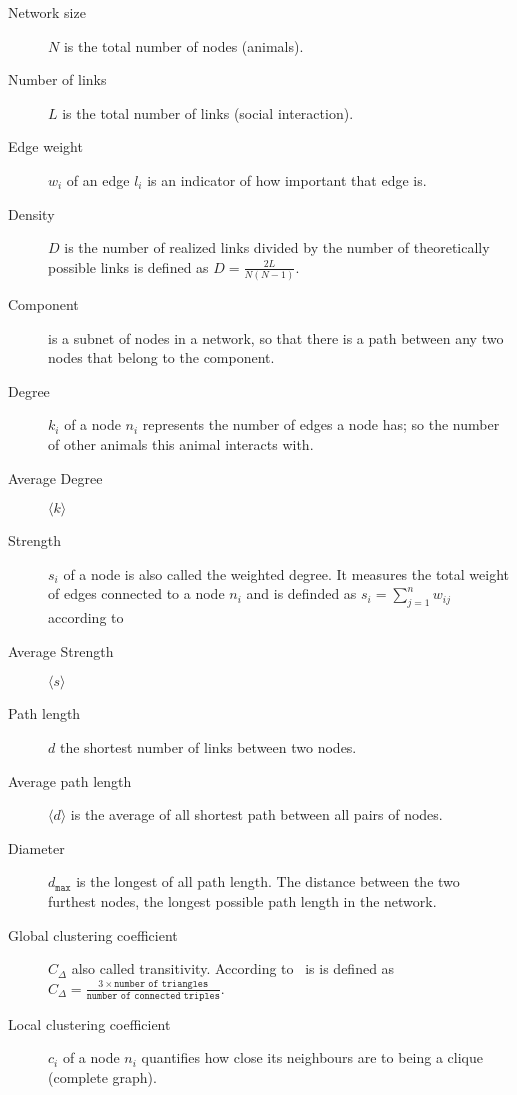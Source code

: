 \begin{description}
\item[Network size] $N$ is the total number of nodes (animals).

\item[Number of links] $L$ is the total number of links (social interaction).

\item[Edge weight] $w_i$ of an edge $l_i$ is an indicator of how important that edge is.

\item[Density] $D$ is the number of realized links divided by the number
of theoretically possible links is defined as $D=\frac{2L}{N(N-1)}$.

\item[Component] is a subnet of nodes in a network, so that there is a path between any two nodes that belong to the component.

\item[Degree] $k_i$ of a node $n_i$ represents the number of edges a node has; so the number of other animals this animal interacts with.

\item[Average Degree] $\langle k \rangle$

\item[Strength] $s_i$ of a node is also called the weighted degree. It measures the total weight of edges connected to a node $n_i$ and is definded as $s_i = \sum_{j=1}^{n}w_{ij}$ according to~\textcite{barrat2004architecture}

\item[Average Strength] $\langle s \rangle$

\item[Path length] $d$ the shortest number of links between two nodes.

\item[Average path length] $\langle d \rangle$ is the average of all shortest path between all pairs of nodes.

\item[Diameter] $d_{\texttt{max}}$ is the longest of all path length. The distance between the two furthest nodes, the longest possible path length in the network.

\item[Global clustering coefficient] $C_\Delta$ also called transitivity. According to~\cite{wasserman1994social} is is defined as $C_\Delta = \frac{3 \times \texttt{number of triangles}}{\texttt{number of connected triples}}$.

\item[Local clustering coefficient] $c_i$ of a node $n_i$ quantifies how close its neighbours are to being a clique (complete graph).

\end{description}

